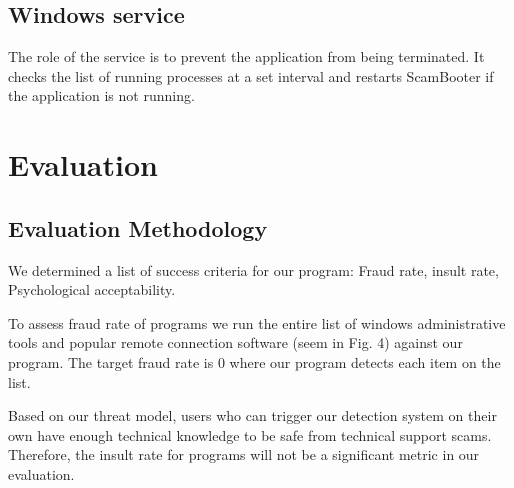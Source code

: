 \documentclass[final]{IEEEtran}
\begin{document}
\subsection{Windows service}
The role of the service is to prevent the application from being terminated. It checks the list of running processes at a set interval and restarts ScamBooter if the application is not running.

\section{Evaluation} %
%




\subsection{Evaluation Methodology}

We determined a list of success criteria for our program: Fraud rate, insult rate, Psychological acceptability.

To assess fraud rate of programs we run the entire list of windows administrative tools and popular remote connection software (seem in Fig. 4) against our program. The target fraud rate is 0 where our program detects each item on the list.

Based on our threat model, users who can trigger our detection system on their own have enough technical knowledge to be safe from technical support scams. Therefore, the insult rate for programs will not be a significant metric in our evaluation. 
\end{document}
